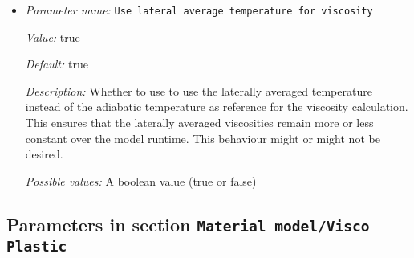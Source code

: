 \begin{itemize}
{\it Default:} 4.7


{\it Description:} The value of the thermal conductivity $k$. Units: $W/m/K$.


{\it Possible values:} A floating point number $v$ such that $0 \leq v \leq \text{MAX\_DOUBLE}$
\item {\it Parameter name:} {\tt Use lateral average temperature for viscosity}
\label{parameters:Material model/Steinberger model/Use lateral average temperature for viscosity}
\label{parameters:Material_20model/Steinberger_20model/Use_20lateral_20average_20temperature_20for_20viscosity}


{\it Value:} true


{\it Default:} true


{\it Description:} Whether to use to use the laterally averaged temperature instead of the adiabatic temperature as reference for the viscosity calculation. This ensures that the laterally averaged viscosities remain more or less constant over the model runtime. This behaviour might or might not be desired.


{\it Possible values:} A boolean value (true or false)
\end{itemize}

\subsection{Parameters in section \tt Material model/Visco Plastic}
\label{parameters:Material_20model/Visco_20Plastic}

